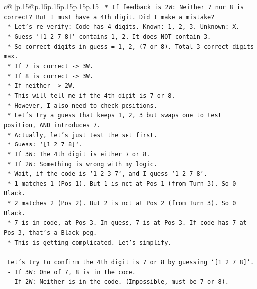 \documentclass{article}
\begin{document}
{\begin{supertabular}{c@{$\;$}|p{.15\linewidth}@{}p{.15\linewidth}p{.15\linewidth}p{.15\linewidth}p{.15\linewidth}p{.15\linewidth}}
{{{\texttt{        *   If feedback is 2W: Neither 7 nor 8 is correct? But I must have a 4th digit. Did I make a mistake?} \\
\texttt{        *   Let's re{-}verify: Code has 4 digits. Known: 1, 2, 3. Unknown: X.} \\
\texttt{        *   Guess `{[}1 2 7 8{]}` contains 1, 2. It does NOT contain 3.} \\
\texttt{        *   So correct digits in guess = 1, 2, (7 or 8). Total 3 correct digits max.} \\
\texttt{        *   If 7 is correct {-}> 3W.} \\
\texttt{        *   If 8 is correct {-}> 3W.} \\
\texttt{        *   If neither {-}> 2W.} \\
\texttt{    *   This will tell me if the 4th digit is 7 or 8.} \\
\texttt{    *   However, I also need to check positions.} \\
\texttt{    *   Let's try a guess that keeps 1, 2, 3 but swaps one to test position, AND introduces 7.} \\
\texttt{    *   Actually, let's just test the set first.} \\
\texttt{    *   Guess: `{[}1 2 7 8{]}`.} \\
\texttt{        *   If 3W: The 4th digit is either 7 or 8.} \\
\texttt{        *   If 2W: Something is wrong with my logic.} \\
\texttt{        *   Wait, if the code is `1 2 3 7`, and I guess `1 2 7 8`.} \\
\texttt{            *   1 matches 1 (Pos 1). But 1 is not at Pos 1 (from Turn 3). So 0 Black.} \\
\texttt{            *   2 matches 2 (Pos 2). But 2 is not at Pos 2 (from Turn 3). So 0 Black.} \\
\texttt{            *   7 is in code, at Pos 3. In guess, 7 is at Pos 3. If code has 7 at Pos 3, that's a Black peg.} \\
\texttt{            *   This is getting complicated. Let's simplify.} \\
\\ 
\texttt{    Let's try to confirm the 4th digit is 7 or 8 by guessing `{[}1 2 7 8{]}`.} \\
\texttt{    {-} If 3W: One of 7, 8 is in the code.} \\
\texttt{    {-} If 2W: Neither is in the code. (Impossible, must be 7 or 8).} \\
}}}
\end{supertabular}}
\end{document}
